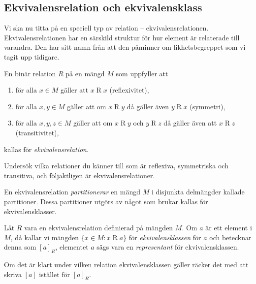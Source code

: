 \subsection{Ekvivalensrelation och ekvivalensklass}
Vi ska nu titta på en speciell typ av relation -- ekvivalensrelationen.
Ekvivalensrelationen har en särskild struktur för hur element är relaterade
till varandra.
Den har sitt namn från att den påminner om likhetsbegreppet som vi tagit upp
tidigare.

\begin{definition}\label{def:Ekvivalensrelation}
  En binär relation \(R\) på en mängd \(M\) som uppfyller att
  \begin{enumerate}
    \item för alla \(x\in M\) gäller att \(x\mathop R x\) (reflexivitet),
    \item för alla \(x,y\in M\) gäller att om \(x\mathop R y\) då gäller även
      \(y\mathop R x\) (symmetri),
    \item för alla \(x,y,z\in M\) gäller att om \(x\mathop R y\) och \(y\mathop 
      R z\)
      då gäller även att \(x\mathop R z\) (transitivitet),
  \end{enumerate}
  kallas för \emph{ekvivalensrelation}.
\end{definition}
\begin{exercise}
  Undersök vilka relationer du känner till som är reflexiva, symmetriska och
  transitiva, och följaktligen är ekvivalensrelationer.
\end{exercise}

En ekvivalensrelation \emph{partitionerar} en mängd \(M\) i disjunkta
delmängder kallade partitioner.
Dessa partitioner utgörs av något som brukar
kallas för ekvivalensklasser. %
\begin{definition}\label{def:Ekvivalensklass}
  Låt \(R\) vara en ekvivalensrelation definierad på mängden \(M\).
  Om \(a\) är ett element i \(M\), då kallar vi mängden
  \(\{x\in M\colon x\mathop R a\}\) för \emph{ekvivalensklassen} för \(a\) och 
  betecknar denna som \([a]_R\), elementet \(a\) sägs vara en 
  \emph{representant} för ekvivalensklassen.
\end{definition}
Om det är klart under vilken relation ekvivalensklassen gäller räcker det med
att skriva \([a]\) istället för \([a]_R\).

